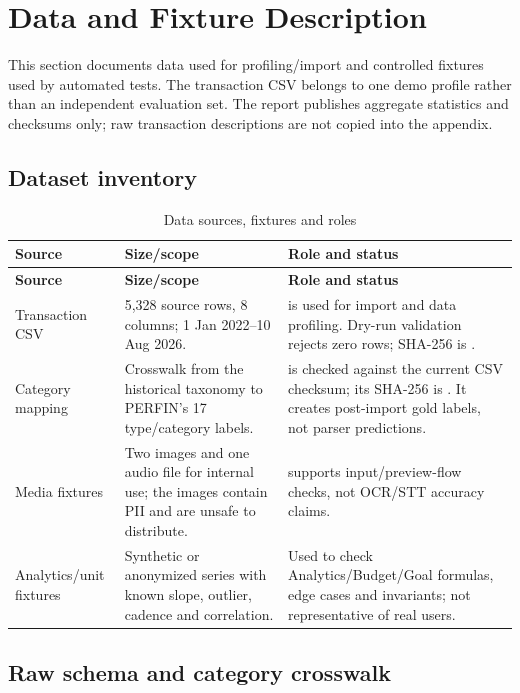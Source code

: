 \section{Data and Fixture Description}
\label{app:dataset-description}

This section documents data used for profiling/import and controlled fixtures used by automated tests. The transaction CSV belongs to one demo profile rather than an independent evaluation set. The report publishes aggregate statistics and checksums only; raw transaction descriptions are not copied into the appendix.

\subsection{Dataset inventory}

\begin{longtable}{@{}L{3.3cm}L{4.2cm}L{7.0cm}@{}}
  \caption{Data sources, fixtures and roles}
  \label{tab:app-dataset-sources}\\
  \toprule
  \textbf{Source} & \textbf{Size/scope} & \textbf{Role and status} \\
  \midrule
  \endfirsthead
  \toprule
  \textbf{Source} & \textbf{Size/scope} & \textbf{Role and status} \\
  \midrule
  \endhead
  Transaction CSV & 5,328 source rows, 8 columns; 1 Jan 2022--10 Aug 2026. &  is used for import and data profiling. Dry-run validation rejects zero rows; SHA-256 is . \\
  Category mapping & Crosswalk from the historical taxonomy to PERFIN's 17 type/category labels. &  is checked against the current CSV checksum; its SHA-256 is . It creates post-import gold labels, not parser predictions. \\
  Media fixtures & Two images and one audio file for internal use; the images contain PII and are unsafe to distribute. &  supports input/preview-flow checks, not OCR/STT accuracy claims. \\
  Analytics/unit fixtures & Synthetic or anonymized series with known slope, outlier, cadence and correlation. & Used to check Analytics/Budget/Goal formulas, edge cases and invariants; not representative of real users. \\
  \bottomrule
\end{longtable}

\subsection{Raw schema and category crosswalk}

